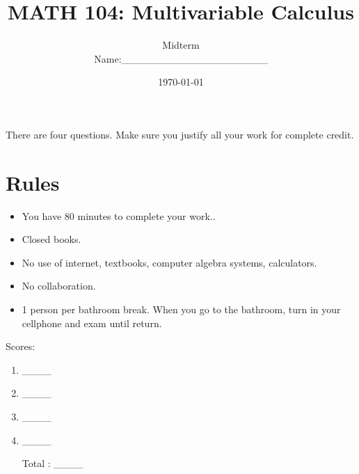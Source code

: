 \documentclass[12pt]{amsart}
\title{ MATH 104: Multivariable Calculus }
\author{Midterm \\ Name:\_\_\_\_\_\_\_\_\_\_\_\_\_\_\_\_\_\_\_\_}
\date{\today}
\begin{document}
\maketitle

There are four questions. Make sure you justify all your work for complete credit.

\section*{Rules}

\begin{itemize}[leftmargin=*]
	\item You have 80  minutes to complete your work..
	\item Closed books.
	\item No use of internet, textbooks, computer algebra systems, calculators.
	\item No collaboration.
	\item 1 person per bathroom break. When you go to the bathroom, turn in your cellphone and exam until return.
\end{itemize}


Scores:
\begin{enumerate}
	\item \_\_\_\_
	\item \_\_\_\_
	\item \_\_\_\_
	\item \_\_\_\_
	\item[Total]: \_\_\_\_
\end{enumerate}

\newpage
\end{document}
